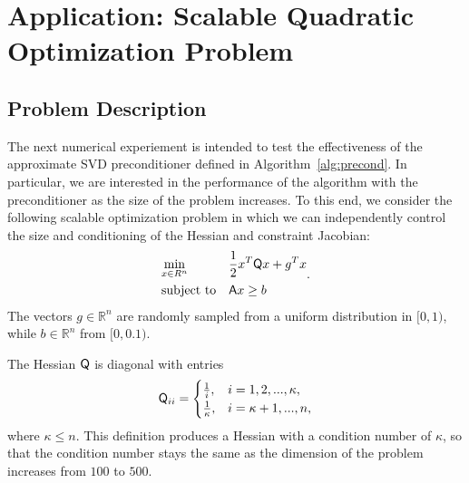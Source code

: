 \section{Application: Scalable Quadratic Optimization Problem}
\subsection{Problem Description}
The next numerical experiement is intended to test the effectiveness of the approximate SVD
preconditioner defined in Algorithm~\ref{alg:precond}.  In particular, we are
interested in the performance of the algorithm with the preconditioner as the size of the problem increases.  
To this end, we consider the following scalable optimization problem
in which we can independently control the size and conditioning of the Hessian
and constraint Jacobian:
\begin{equation}\label{eq:quadra}
  \begin{aligned}
    &\underset{x \in R^n} {\text{min}}  
    & & \frac{1}{2}x^T \mathsf{Q} x + g^T x \\
    &\text{subject to} & & \mathsf{A}x \geq b  \\
  \end{aligned}.
\end{equation}
The vectors $g\in \mathbb{R}^{n}$ are randomly sampled from a uniform distribution 
in $[ 0,1)$, while $b \in \mathbb{R}^{n}$ from $[0,0.1)$. 

The Hessian $\mathsf{Q}$ is diagonal with entries
\begin{equation*}
  \mathsf{Q}_{ii} = \begin{cases}
    \frac{1}{i}, &  i = 1, 2, ...,  \kappa, \\
    \frac{1}{\kappa}, & i =  \kappa+1, ... , n, \\
  \end{cases}
\end{equation*}
where $\kappa \leq n$.  This definition produces a Hessian with a condition
number of $\kappa$,  so that the condition number
stays the same as the dimension of the problem increases from $100$ to $500$. 

